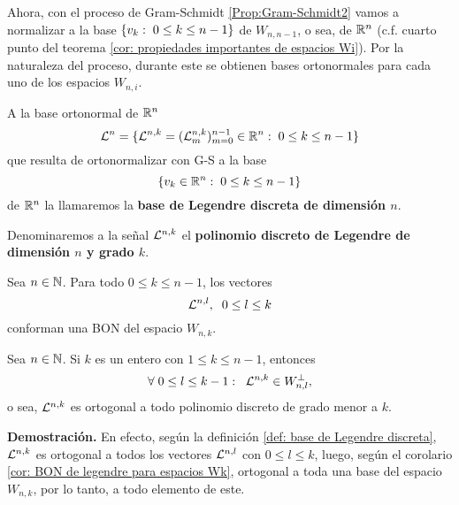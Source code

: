 \noindent Ahora, con el proceso de Gram-Schmidt \ref{Prop:Gram-Schmidt2}
vamos a normalizar
a la base $\{v_{k}: \hspace{0.1cm} 0 \leq k \leq n-1 \}$ de
$W_{n,n-1}$, o sea, de $\mathbb{R}^{n}$ (c.f. 
cuarto punto del teorema
\ref{cor: propiedades importantes de espacios Wi}). 
Por la naturaleza del proceso, durante este se
obtienen bases ortonormales para cada uno de los espacios 
$W_{n,i}$. 



\begin{defi} 
\label{def: base de Legendre discreta}
A la base ortonormal de $\mathbb{R}^{n}$
\begin{equation}
\label{eq: base de Legendre discreta}
\mathcal{L}^{n}=\{ \mathcal{L}^{n,k}= (\mathcal{L}_{m}^{n,k})_{m=0}^{n-1} \in \mathbb{R}^{n}: 
\hspace{0.1cm} 0 \leq k \leq n-1\}
\end{equation}
que resulta de ortonormalizar con G-S a la base
\[
\{v_{k} \in \mathbb{R}^{n}: \hspace{0.1cm} 0 \leq k \leq n-1 \}
\]
de $\mathbb{R}^{n}$ la llamaremos la
\textbf{base de Legendre discreta de dimensión $n$}.

Denominaremos a la señal $\mathcal{L}^{n,k}$ el 
\textbf{polinomio discreto de Legendre de dimensión
$n$ y grado $k$}.
\end{defi}

\begin{cor} \label{cor: BON de legendre para espacios Wk}
Sea $n \in \mathbb{N}$. Para todo $0 \leq k \leq n-1$, los vectores
\[
\mathcal{L}^{n, l}, \hspace{0.2cm} 0 \leq l \leq k
\]
conforman una BON del espacio $W_{n,k}$.
\end{cor}

\begin{cor} \label{cor: Ln,k ortogonal a todo pol discreto de grado menor a k}
Sea $n \in \mathbb{N}$. Si $k$ es un entero con $1 \leq k \leq n-1$,
entonces
\[
\forall \hspace{0.1cm} 0 \leq l \leq k-1:
\hspace{0.2cm}
\mathcal{L}^{n,k} \in W_{n,l}^{\perp},
\]
o sea, 
$\mathcal{L}^{n,k}$ es ortogonal a todo polinomio discreto
de grado menor a $k$.
\end{cor}
\noindent
\textbf{Demostración.}
En efecto, según la definición
\ref{def: base de Legendre discreta}, 
$\mathcal{L}^{n,k}$ es ortogonal a todos los vectores
$\mathcal{L}^{n, l}$ con $0 \leq l \leq k$,
luego, según el corolario
\ref{cor: BON de legendre para espacios Wk},
ortogonal a toda una base del espacio $W_{n,k}$,
por lo tanto, a todo elemento de este.
\QEDB
\vspace{0.2cm}



